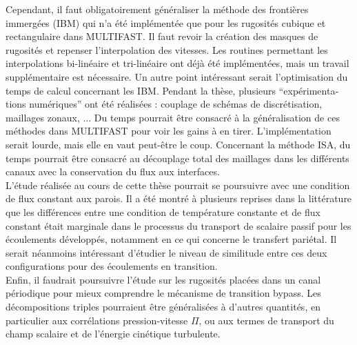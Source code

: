 \vspace{1cm}
Cependant, il faut obligatoirement généraliser la méthode des frontières immergées (IBM) qui n'a été implémentée que pour les rugosités cubique et rectangulaire dans MULTIFAST. Il faut revoir la création des masques de rugosités et repenser l’interpolation des vitesses. Les routines permettant les interpolations bi-linéaire et tri-linéaire ont déjà été implémentées, mais un travail supplémentaire est nécessaire. Un autre point intéressant serait l'optimisation du temps de calcul concernant les IBM. Pendant la thèse, plusieurs \foreignquote{french}{expérimentations numériques} ont été réalisées : couplage de schémas de discrétisation, maillages zonaux, ... Du temps pourrait être consacré à la généralisation de ces méthodes dans MULTIFAST pour voir les gains à en tirer. L'implémentation serait lourde, mais elle en vaut peut-être le coup. Concernant la méthode ISA, du temps pourrait être consacré au découplage total des maillages dans les différents canaux avec la conservation du flux aux interfaces.\\

\vspace{1cm}
L'étude réalisée au cours de cette thèse pourrait se poursuivre avec une condition de flux constant aux parois. Il a été montré à plusieurs reprises dans la littérature que les différences entre une condition de température constante et de flux constant était marginale dans le processus du transport de scalaire passif pour les écoulements développés, notamment en ce qui concerne le transfert pariétal. Il serait néanmoins intéressant d'étudier le niveau de similitude entre ces deux configurations pour des écoulements en transition.\\

\vspace{1cm}
Enfin, il faudrait poursuivre l'étude sur les rugosités placées dans un canal périodique pour mieux comprendre le mécanisme de transition bypass. Les décompositions triples pourraient être généralisées à d’autres quantités, en particulier aux corrélations pression-vitesse $\Pi$, ou aux termes de transport du champ scalaire et de l'énergie cinétique turbulente.
